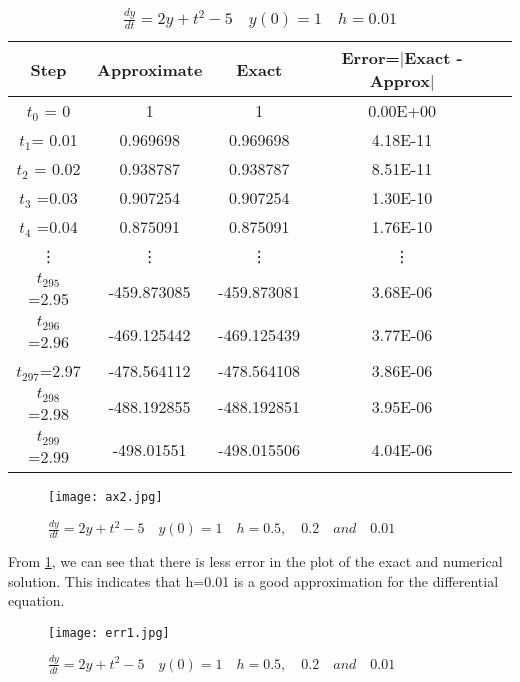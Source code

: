 \documentclass[12pt,a4paper]{article}
\begin{document}
\begin{table}[ht]\caption{$\frac{dy}{dt} = 2y + t^2 - 5  \quad y(0)=1 \quad h=0.01$}
\begin{center}
\begin{tabular}{|c|c|c|c|c|}
\hline
Step  &  Approximate  & Exact & Error=$|$Exact - Approx$|$ \\
\hline
$t_0$ = 0 &	1 &	1	& 0.00E+00\\
\hline
$t_1$= 0.01 &	0.969698	& 0.969698	& 4.18E-11 \\
\hline
$t_2$ = 0.02 & 0.938787 & 0.938787	& 8.51E-11 \\
\hline
$t_3$ =0.03 &	0.907254	& 0.907254	& 1.30E-10 \\
\hline
$t_4$ =0.04 &	0.875091	& 0.875091	& 1.76E-10\\
\hline
\vdots & \vdots & \vdots & \vdots \\
\hline
$t_{295}$ =2.95	& -459.873085 &	-459.873081	& 3.68E-06\\
\hline
$t_{296}$ =2.96	& -469.125442 &	-469.125439	& 3.77E-06\\
\hline
$t_{297}$=2.97	& -478.564112 &	-478.564108 & 3.86E-06\\
\hline
$t_{298}$ =2.98	& -488.192855 &	-488.192851	& 3.95E-06\\
\hline
$t_{299}$ =2.99	& -498.01551 & -498.015506 & 4.04E-06\\
\hline
\end{tabular}
\end{center}
\end{table}

\begin{figure}[h]
  \begin{center}
  \texttt{[image: ax2.jpg]}
  \end{center}
  \caption{$\frac{dy}{dt} = 2y + t^2 - 5 \quad y(0)= 1 \quad h = 0.5, \quad 0.2 \quad and \quad 0.01 $}
  \label{fig:1.3}
\end{figure}

From \ref{fig:1.3}, we can see that there is less error in the plot of the exact and numerical solution. This indicates that h=0.01 is a good approximation for the differential equation.

\begin{figure}[h]
  \begin{center}
  \texttt{[image: err1.jpg]}
  \end{center}
  \caption{$\frac{dy}{dt} = 2y + t^2 - 5 \quad y(0)= 1 \quad h = 0.5, \quad 0.2 \quad and \quad 0.01 $}
  \label{fig:1.4}
\end{figure}
\end{document}

